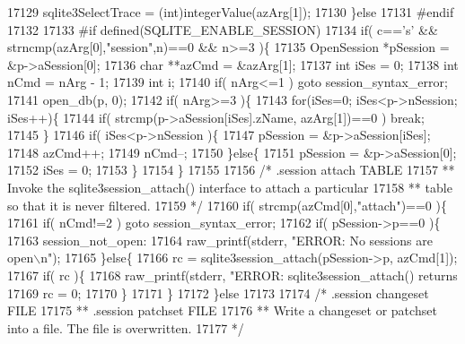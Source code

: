 \begin{DoxyCode}
{{{{{{{{{{{{{{{{{{{{{{{{{{{{{{{{{{{{{{{{{{{{{{{{{{{{{{{{{{{{{{{{{{{{{{{{{{{{{{{{{{{17129     sqlite3SelectTrace = (int)integerValue(azArg[1]);
17130   \}\textcolor{keywordflow}{else}
17131 \textcolor{preprocessor}{#endif}
17132 
17133 \textcolor{preprocessor}{#if defined(SQLITE\_ENABLE\_SESSION)}
17134   \textcolor{keywordflow}{if}( c==\textcolor{charliteral}{'s'} && strncmp(azArg[0],\textcolor{stringliteral}{"session"},n)==0 && n>=3 )\{
17135     OpenSession *pSession = &p->aSession[0];
17136     \textcolor{keywordtype}{char} **azCmd = &azArg[1];
17137     \textcolor{keywordtype}{int} iSes = 0;
17138     \textcolor{keywordtype}{int} nCmd = nArg - 1;
17139     \textcolor{keywordtype}{int} i;
17140     \textcolor{keywordflow}{if}( nArg<=1 ) \textcolor{keywordflow}{goto} session\_syntax\_error;
17141     open_db(p, 0);
17142     \textcolor{keywordflow}{if}( nArg>=3 )\{
17143       \textcolor{keywordflow}{for}(iSes=0; iSes<p->nSession; iSes++)\{
17144         \textcolor{keywordflow}{if}( strcmp(p->aSession[iSes].zName, azArg[1])==0 ) \textcolor{keywordflow}{break};
17145       \}
17146       \textcolor{keywordflow}{if}( iSes<p->nSession )\{
17147         pSession = &p->aSession[iSes];
17148         azCmd++;
17149         nCmd--;
17150       \}\textcolor{keywordflow}{else}\{
17151         pSession = &p->aSession[0];
17152         iSes = 0;
17153       \}
17154     \}
17155 
17156     \textcolor{comment}{/* .session attach TABLE}
17157 \textcolor{comment}{    ** Invoke the sqlite3session\_attach() interface to attach a particular}
17158 \textcolor{comment}{    ** table so that it is never filtered.}
17159 \textcolor{comment}{    */}
17160     \textcolor{keywordflow}{if}( strcmp(azCmd[0],\textcolor{stringliteral}{"attach"})==0 )\{
17161       \textcolor{keywordflow}{if}( nCmd!=2 ) \textcolor{keywordflow}{goto} session\_syntax\_error;
17162       \textcolor{keywordflow}{if}( pSession->p==0 )\{
17163         session\_not\_open:
17164         raw_printf(stderr, \textcolor{stringliteral}{"ERROR: No sessions are open\(\backslash\)n"});
17165       \}\textcolor{keywordflow}{else}\{
17166         rc = sqlite3session\_attach(pSession->p, azCmd[1]);
17167         \textcolor{keywordflow}{if}( rc )\{
17168           raw_printf(stderr, \textcolor{stringliteral}{"ERROR: sqlite3session\_attach() returns %
17169           rc = 0;
17170         \}
17171       \}
17172     \}\textcolor{keywordflow}{else}
17173 
17174     \textcolor{comment}{/* .session changeset FILE}
17175 \textcolor{comment}{    ** .session patchset FILE}
17176 \textcolor{comment}{    ** Write a changeset or patchset into a file.  The file is overwritten.}
17177 \textcolor{comment}{    */}
}}}}}}}}}}}}}}}}}}}}}}}}}}}}}}}}}}}}}}}}}}}}}}}}}}}}}}}}}}}}}}}}}}}}}}}}}}}}}}}}}}}}
\end{DoxyCode}
